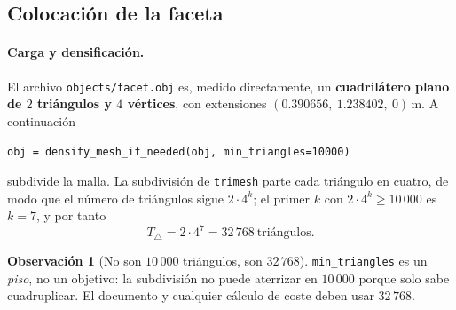 \documentclass[11pt,a4paper]{article}
\newcommand{\code}[1]{\texttt{#1}}
\theoremstyle{definition}
\newtheorem{obs}{Observación}
\theoremstyle{plain}
\begin{document}
\subsection{Colocación de la faceta}
\label{sec:placement}

\paragraph{Carga y densificación.}
El archivo \code{objects/facet.obj} es, medido directamente, un
\textbf{cuadrilátero plano de $2$ triángulos y $4$ vértices}, con extensiones
$(0.390656,\ 1.238402,\ 0)\,$m. A continuación
%
\begin{center}
\code{obj = densify\_mesh\_if\_needed(obj, min\_triangles=10000)}
\end{center}
%
subdivide la malla. La subdivisión de \code{trimesh} parte cada triángulo en
cuatro, de modo que el número de triángulos sigue $2\cdot4^k$; el primer $k$ con
$2\cdot4^k\ge10\,000$ es $k=7$, y por tanto
%
\begin{equation}
\label{eq:ntri}
T_{\triangle} = 2\cdot4^7 = 32\,768\ \text{triángulos}.
\end{equation}

\begin{obs}[No son $10\,000$ triángulos, son $32\,768$]
\label{obs:ntri}
\code{min\_triangles} es un \emph{piso}, no un objetivo: la subdivisión no puede
aterrizar en $10\,000$ porque solo sabe cuadruplicar. El documento y cualquier
cálculo de coste deben usar $32\,768$.
\end{obs}
\end{document}
